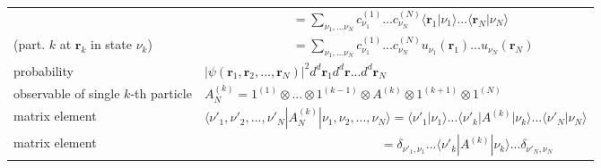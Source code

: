 \documentclass[../main.tex]{subfiles}
\begin{document}
\begin{enumerate}[(a)]
\begin{table}
\begin{tabular}{ll}
& $\qquad\qquad\qquad\quad=\sum_{\nu_1,...\nu_N}c_{\nu_1}^{(1)}...c_{\nu_N}^{(N)}\langle\mathbf{r}_1|\nu_1\rangle...\langle\mathbf{r}_N|\nu_N\rangle$\\
(part. $k$ at $\mathbf{r}_k$ in state $\nu_k$)& $\qquad\qquad\qquad\quad=\sum_{\nu_1,...\nu_N}c_{\nu_1}^{(1)}...c_{\nu_N}^{(N)}u_{\nu_1}(\mathbf{r}_1)...u_{\nu_N}(\mathbf{r}_N)$\\
probability & $|\psi(\mathbf{r}_1,\mathbf{r}_2,...,\mathbf{r}_N)|^2d^d\mathbf{r}_1 d^d\mathbf{r}... d^d\mathbf{r}_N$\\
observable of single $k$-th particle &$A_N^{(k)}=1^{(1)}\otimes...\otimes1^{(k-1)}\otimes A^{(k)}\otimes1^{(k+1)}\otimes1^{(N)}$\\
matrix element &  $\langle\nu'_1,\nu'_2,...,\nu'_N|A^{(k)}_N|\nu_1,\nu_2,...,\nu_N\rangle=\langle\nu'_1|\nu_1\rangle...\langle\nu'_k|A^{(k)}|\nu_k\rangle...\langle\nu'_N|\nu_N\rangle$\\
matrix element &  $\qquad\qquad\qquad\qquad\qquad\qquad\qquad=\delta_{\nu'_1,\nu_1}...\langle\nu'_k|A^{(k)}|\nu_k\rangle...\delta_{\nu'_N,\nu_N}$\\
\end{tabular}
\end{table}




\end{enumerate}
\end{document}
